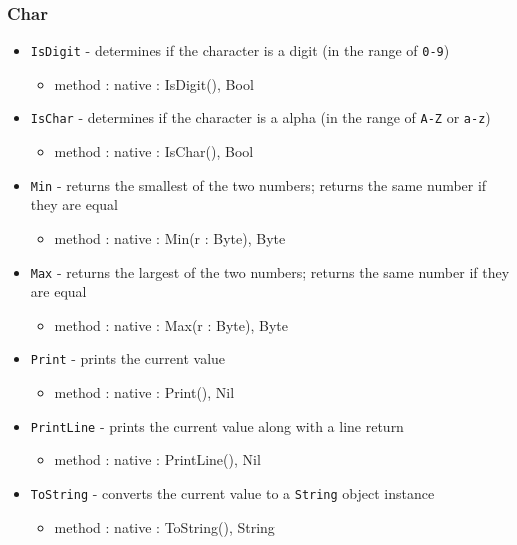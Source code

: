 \documentclass[12pt]{article}
\begin{document}
\subsubsection{Char}
\begin{itemize}
    \item \texttt{IsDigit} - determines if the character is a digit (in the range of \texttt{0-9})
    	\begin{itemize}
	\item method : native : IsDigit(), Bool
	\end{itemize}
    \item \texttt{IsChar} - determines if the character is a alpha (in the range of \texttt{A-Z} or \texttt{a-z})
    	\begin{itemize}
	\item method : native : IsChar(), Bool
	\end{itemize}
    \item \texttt{Min} - returns the smallest of the two numbers; returns the same number if they are equal
    	\begin{itemize}
	\item method : native : Min(r : Byte), Byte
	\end{itemize}
    \item \texttt{Max} - returns the largest of the two numbers; returns the same number if they are equal
    	\begin{itemize}
	\item method : native : Max(r : Byte), Byte
	\end{itemize}
    \item \texttt{Print} - prints the current value
    	\begin{itemize}
	\item method : native : Print(), Nil
	\end{itemize}
    \item \texttt{PrintLine} - prints the current value along with a line return
    	\begin{itemize}
	\item method : native : PrintLine(), Nil
	\end{itemize}
    \item \texttt{ToString} - converts the current value to a \texttt{String} object instance
   	\begin{itemize}
	\item method : native : ToString(), String
	\end{itemize}
\end{itemize}
\end{document}
